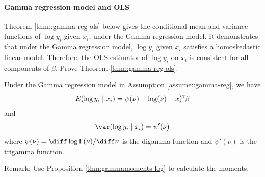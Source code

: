 \paragraph{Gamma regression model and OLS}
\label{hw20::gamma-regression}

Theorem \ref{thm::gamma-reg-ols} below gives the conditional mean and variance functions of $\log y_i$ given $x_i$, under the Gamma regression model. It demonstrates that under the Gamma regression model, $\log y_i$ given $x_i$ satisfies a homoskedastic linear model. Therefore, the OLS estimator of $\log y_i$ on $x_i$ is consistent for all components of $\beta$.  
Prove Theorem \ref{thm::gamma-reg-ols}. 

\begin{theorem}
\label{thm::gamma-reg-ols}
Under the Gamma regression model in Assumption \ref{assume::gamma-reg}, we have  
$$
E(\log y_i \mid x_i ) = \psi(\nu) - \log (\nu) + x_i^{\T} \beta
$$
and
$$
\var(\log y_i \mid x_i ) = \psi'(\nu)
$$
where $\psi(\nu) = \diff \log  \Gamma  (\nu) / \diff \nu$ is the digamma function and $\psi'(\nu)$ is the trigamma function. 
\end{theorem}

 

Remark: Use Proposition \ref{thm:gammamoments-log} to calculate the moments.  
